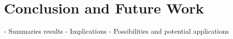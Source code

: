 \newpage
\section{Conclusion and Future Work} \label{conclusion_and_future_work}

- Summaries results
- Implications
- Possibilities and potential applications